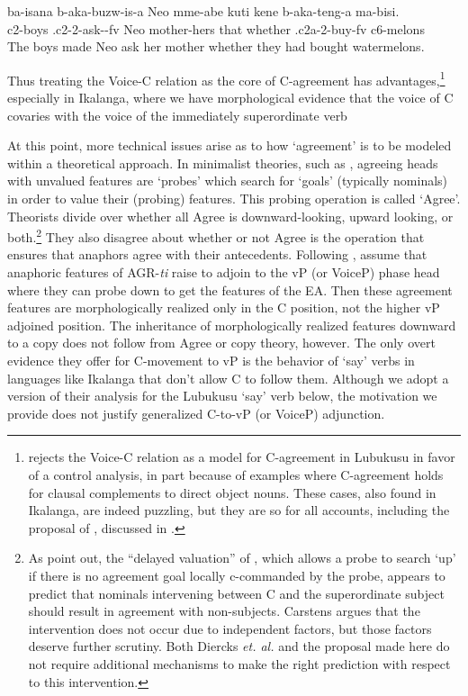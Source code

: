 \documentclass[output=paper,
modfonts
]{langscibook}
\begin{document}
\ea\label{n30} \gll ba-isana	b-aka-buzw-is-a			Neo	mme-abe	kuti	kene b-aka-teng-a		ma-bisi.\\
       c2-boys	.c2-2-ask--fv	Neo	mother-hers	that whether .c2a-2-buy-fv	c6-melons\\
    \glt The boys made Neo ask her mother whether they had bought watermelons. \z 

Thus treating the Voice-C relation as the core of C-agreement has advantages,\footnote{\citet[367--369]{Diercks2010} rejects the Voice-C relation as a model for C-agreement in Lubukusu in favor of a control analysis, in part because of examples where C-agreement holds for clausal complements to direct object nouns. These cases, also found in Ikalanga, are indeed puzzling, but they are so for all accounts, including the proposal of \citet{Diercks2017a}, discussed in .}  especially in Ikalanga, where we have morphological evidence that the voice of C covaries with the voice of the immediately superordinate verb

At this point, more technical issues arise as to how `agreement' is to be modeled within a theoretical approach. In minimalist theories, such as \citet{Chomsky2001}, 
agreeing heads with unvalued features are `probes' which search for `goals' (typically nominals) in order to value their (probing) features. This probing operation is called `Agree'. Theorists divide over whether all Agree is downward-looking, upward looking, or both.\footnote{As \cite{Diercks2017a} point out, the ``delayed valuation'' of \citet{Carstens2016}, which allows a probe to search `up' if there is no agreement goal locally c-commanded by the probe, appears to predict that nominals intervening between C and the superordinate subject should result in agreement with non-subjects. Carstens argues that the intervention does not occur due to independent factors, but those factors deserve further scrutiny. Both Diercks \textit{et. al.} and the proposal made here do not require additional mechanisms to make the right prediction with respect to this intervention.} They also disagree about whether or not Agree is the operation that ensures that anaphors agree with their antecedents. Following \citet{Rooryck2011}, \citet{Diercks2017a} assume that anaphoric features of AGR-\textit{ti} raise to adjoin to the vP (or VoiceP) phase head where they can probe down to get the features of the EA. Then these agreement features are morphologically realized only in the C position, not the higher vP adjoined position. The inheritance of morphologically realized features downward to a copy does not follow from Agree or copy theory, however. The only overt evidence they offer for C-movement to vP is the behavior of `say' verbs in languages like Ikalanga that don’t allow C to follow them. Although we adopt a version of their analysis for the Lubukusu `say' verb below, the motivation we provide does not justify generalized C-to-vP (or VoiceP) adjunction.
\end{document}
